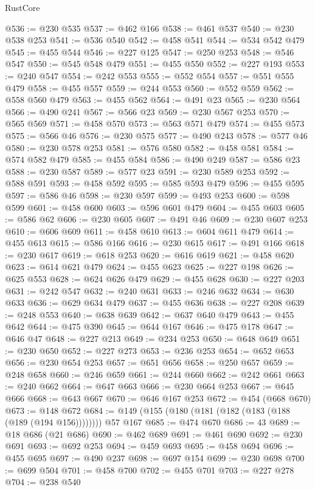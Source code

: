 \begin{lexlean}{RustCore}
\begin{coremodule}
@536 := @230 @535
@537 := @462 @166
@538 := @461 @537
@540 := @230 @538 @253
@541 := @536 @540
@542 := @458 @541
@544 := @534 @542 @479
@545 := @455 @544
@546 := @227 @125
@547 := @250 @253
@548 := @546 @547
@550 := @545 @548 @479
@551 := @455 @550
@552 := @227 @193
@553 := @240 @547
@554 := @242 @553
@555 := @552 @554
@557 := @551 @555 @479
@558 := @455 @557
@559 := @244 @553
@560 := @552 @559
@562 := @558 @560 @479
@563 := @455 @562
@564 := @491 @23
@565 := @230 @564
@566 := @490 @241
@567 := @566 @23
@569 := @230 @567 @253
@570 := @565 @569
@571 := @458 @570
@573 := @563 @571 @479
@574 := @455 @573
@575 := @566 @46
@576 := @230 @575
@577 := @490 @243
@578 := @577 @46
@580 := @230 @578 @253
@581 := @576 @580
@582 := @458 @581
@584 := @574 @582 @479
@585 := @455 @584
@586 := @490 @249
@587 := @586 @23
@588 := @230 @587
@589 := @577 @23
@591 := @230 @589 @253
@592 := @588 @591
@593 := @458 @592
@595 := @585 @593 @479
@596 := @455 @595
@597 := @586 @46
@598 := @230 @597
@599 := @493 @253
@600 := @598 @599
@601 := @458 @600
@603 := @596 @601 @479
@604 := @455 @603
@605 := @586 @62
@606 := @230 @605
@607 := @491 @46
@609 := @230 @607 @253
@610 := @606 @609
@611 := @458 @610
@613 := @604 @611 @479
@614 := @455 @613
@615 := @586 @166
@616 := @230 @615
@617 := @491 @166
@618 := @230 @617
@619 := @618 @253
@620 := @616 @619
@621 := @458 @620
@623 := @614 @621 @479
@624 := @455 @623
@625 := @227 @198
@626 := @625 @553
@628 := @624 @626 @479
@629 := @455 @628
@630 := @227 @203
@631 := @242 @547
@632 := @240 @631
@633 := @246 @632
@634 := @630 @633
@636 := @629 @634 @479
@637 := @455 @636
@638 := @227 @208
@639 := @248 @553
@640 := @638 @639
@642 := @637 @640 @479
@643 := @455 @642
@644 := @475 @390
@645 := @644 @167
@646 := @475 @178
@647 := @646 @47
@648 := @227 @213
@649 := @234 @253
@650 := @648 @649
@651 := @230 @650
@652 := @227 @273
@653 := @236 @253
@654 := @652 @653
@656 := @230 @654 @253
@657 := @651 @656
@658 := @250 @657
@659 := @248 @658
@660 := @246 @659
@661 := @244 @660
@662 := @242 @661
@663 := @240 @662
@664 := @647 @663
@666 := @230 @664 @253
@667 := @645 @666
@668 := @643 @667
@670 := @646 @167 @253
@672 := @454 (@668 @670)
@673 := @148 @672
@684 := @149 (@155 (@180 (@181 (@182 (@183 (@188 (@189 (@194 @156)))))))) @57 @167
@685 := @474 @670
@686 := 43
@689 := @18 @686 (@21 @686)
@690 := @462 @689
@691 := @461 @690
@692 := @230 @691
@693 := @692 @253
@694 := @459 @693
@695 := @458 @694
@696 := @455 @695
@697 := @490 @237
@698 := @697 @154
@699 := @230 @698
@700 := @699 @504
@701 := @458 @700
@702 := @455 @701
@703 := @227 @278
@704 := @238 @540

\end{coremodule}
\end{lexlean}
